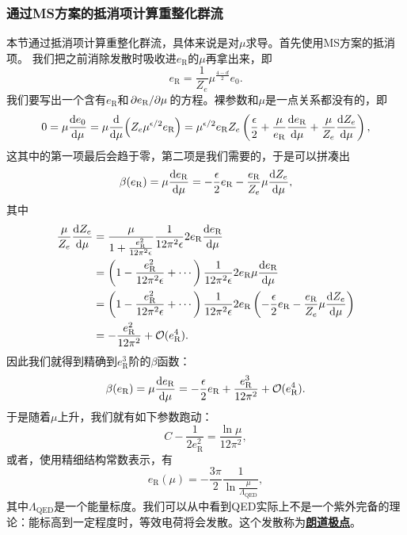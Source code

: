 \documentclass[hyperref, UTF8, a4paper]{ctexart}
\newcommand{\concept}[1]{\underline{\textbf{#1}}}
\newcommand*{\bigO}[1]{\mathcal{O}{#1}}
\begin{document}
\subsubsection{通过MS方案的抵消项计算重整化群流}

本节通过抵消项计算重整化群流，具体来说是对$\mu$求导。首先使用MS方案的抵消项。
我们把之前消除发散时吸收进$e_\text{R}$的$\mu$再拿出来，即
\begin{equation}
    e_\text{R} = \frac{1}{Z_e} \mu^{\frac{4-d}{2}} e_0.
\end{equation}
我们要写出一个含有$e_\text{R}$和$\pdv*{e_\text{R}}{\mu}$的方程。裸参数和$\mu$是一点关系都没有的，即
\[
    0 = \mu \dv{e_0}{\mu} = \mu \dv{\mu} (Z_e \mu^{\epsilon / 2} e_\text{R}) = \mu^{\epsilon/2} e_\text{R} Z_e \left( \frac{\epsilon}{2} + \frac{\mu}{e_\text{R}} \dv{e_\text{R}}{\mu} + \frac{\mu}{Z_e} \dv{Z_e}{\mu} \right),
\]
这其中的第一项最后会趋于零，第二项是我们需要的，于是可以拼凑出
\[
    \beta(e_\text{R}) = \mu \dv{e_\text{R}}{\mu} = - \frac{\epsilon}{2} e_\text{R} - \frac{e_\text{R}}{Z_e} \mu \dv{Z_e}{\mu},
\]
其中
\[
    \begin{aligned}
        \frac{\mu}{Z_e} \dv{Z_e}{\mu} &= \frac{\mu}{1 + \frac{e_\text{R}^2}{12 \pi^2 \epsilon}} \frac{1}{12\pi^2 \epsilon} 2 e_\text{R} \dv{e_\text{R}}{\mu} \\
        &= \left( 1 - \frac{e_\text{R}^2}{12 \pi^2 \epsilon} + \cdots \right) \frac{1}{12 \pi^2 \epsilon} 2 e_\text{R} \mu \dv{e_\text{R}}{\mu} \\
        &= \left( 1 - \frac{e_\text{R}^2}{12 \pi^2 \epsilon} + \cdots \right) \frac{1}{12 \pi^2 \epsilon} 2 e_\text{R} \left( - \frac{\epsilon}{2} e_\text{R} - \frac{e_\text{R}}{Z_e} \mu \dv{Z_e}{\mu} \right) \\
        &= - \frac{e_\text{R}^2}{12 \pi^2} + \bigO(e_\text{R}^4).
    \end{aligned}
\]
因此我们就得到精确到$e_\text{R}^3$阶的$\beta$函数：
\begin{equation}
    \beta(e_\text{R}) = \mu \dv{e_\text{R}}{\mu} = - \frac{\epsilon}{2} e_\text{R} + \frac{e_\text{R}^3}{12 \pi^2} + \bigO(e_\text{R}^4).
\end{equation}
于是随着$\mu$上升，我们就有如下参数跑动：
\[
    C - \frac{1}{2 e_\text{R}^2} = \frac{\ln \mu}{12 \pi^2},
\]
或者，使用精细结构常数表示，有
\begin{equation}
    e_\text{R}(\mu) = - \frac{3 \pi}{2} \frac{1}{\ln \frac{\mu}{\Lambda_\text{QED}}},
\end{equation}
其中$\Lambda_\text{QED}$是一个能量标度。我们可以从中看到QED实际上不是一个紫外完备的理论：能标高到一定程度时，等效电荷将会发散。这个发散称为\concept{朗道极点}。
\end{document}
